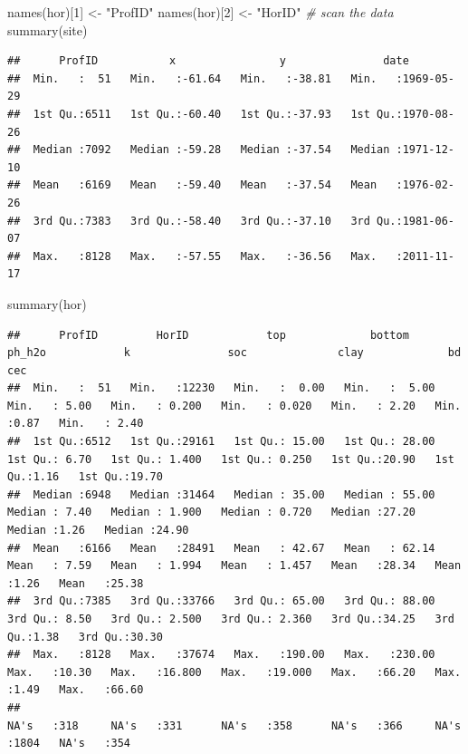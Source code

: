 \documentclass[
  10pt,
  b5paper,
  oneside]{book}
\newenvironment{Shaded}{\begin{snugshade}}{\end{snugshade}}
\newcommand{\CommentTok}[1]{\textcolor[rgb]{0.56,0.35,0.01}{\textit{#1}}}
\newcommand{\DecValTok}[1]{\textcolor[rgb]{0.00,0.00,0.81}{#1}}
\newcommand{\FunctionTok}[1]{\textcolor[rgb]{0.00,0.00,0.00}{#1}}
\newcommand{\NormalTok}[1]{#1}
\newcommand{\OtherTok}[1]{\textcolor[rgb]{0.56,0.35,0.01}{#1}}
\newcommand{\StringTok}[1]{\textcolor[rgb]{0.31,0.60,0.02}{#1}}
\begin{document}
\begin{Shaded}
\begin{Highlighting}[]
\FunctionTok{names}\NormalTok{(hor)[}\DecValTok{1}\NormalTok{] }\OtherTok{\textless{}{-}} \StringTok{"ProfID"}
\FunctionTok{names}\NormalTok{(hor)[}\DecValTok{2}\NormalTok{] }\OtherTok{\textless{}{-}} \StringTok{"HorID"}
\CommentTok{\# scan the data}
\FunctionTok{summary}\NormalTok{(site)}
\end{Highlighting}
\end{Shaded}

\begin{verbatim}
##      ProfID           x                y               date           
##  Min.   :  51   Min.   :-61.64   Min.   :-38.81   Min.   :1969-05-29  
##  1st Qu.:6511   1st Qu.:-60.40   1st Qu.:-37.93   1st Qu.:1970-08-26  
##  Median :7092   Median :-59.28   Median :-37.54   Median :1971-12-10  
##  Mean   :6169   Mean   :-59.40   Mean   :-37.54   Mean   :1976-02-26  
##  3rd Qu.:7383   3rd Qu.:-58.40   3rd Qu.:-37.10   3rd Qu.:1981-06-07  
##  Max.   :8128   Max.   :-57.55   Max.   :-36.56   Max.   :2011-11-17
\end{verbatim}

\begin{Shaded}
\begin{Highlighting}[]
\FunctionTok{summary}\NormalTok{(hor)}
\end{Highlighting}
\end{Shaded}

\begin{verbatim}
##      ProfID         HorID            top             bottom           ph_h2o            k               soc              clay             bd            cec       
##  Min.   :  51   Min.   :12230   Min.   :  0.00   Min.   :  5.00   Min.   : 5.00   Min.   : 0.200   Min.   : 0.020   Min.   : 2.20   Min.   :0.87   Min.   : 2.40  
##  1st Qu.:6512   1st Qu.:29161   1st Qu.: 15.00   1st Qu.: 28.00   1st Qu.: 6.70   1st Qu.: 1.400   1st Qu.: 0.250   1st Qu.:20.90   1st Qu.:1.16   1st Qu.:19.70  
##  Median :6948   Median :31464   Median : 35.00   Median : 55.00   Median : 7.40   Median : 1.900   Median : 0.720   Median :27.20   Median :1.26   Median :24.90  
##  Mean   :6166   Mean   :28491   Mean   : 42.67   Mean   : 62.14   Mean   : 7.59   Mean   : 1.994   Mean   : 1.457   Mean   :28.34   Mean   :1.26   Mean   :25.38  
##  3rd Qu.:7385   3rd Qu.:33766   3rd Qu.: 65.00   3rd Qu.: 88.00   3rd Qu.: 8.50   3rd Qu.: 2.500   3rd Qu.: 2.360   3rd Qu.:34.25   3rd Qu.:1.38   3rd Qu.:30.30  
##  Max.   :8128   Max.   :37674   Max.   :190.00   Max.   :230.00   Max.   :10.30   Max.   :16.800   Max.   :19.000   Max.   :66.20   Max.   :1.49   Max.   :66.60  
##                                                                   NA's   :318     NA's   :331      NA's   :358      NA's   :366     NA's   :1804   NA's   :354
\end{verbatim}
\end{document}
